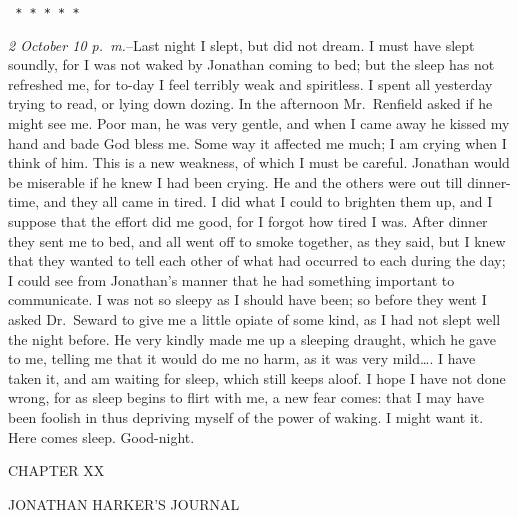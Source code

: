 \documentclass[12pt,openright]{book}
\begin{document}
\texttt{   *       *       *       *       *}

\textit{2 October 10 p. m.}–Last night I slept, but did not dream. I must have slept soundly, for I was not waked by Jonathan coming to bed; but the sleep has not refreshed me, for to-day I feel terribly weak and spiritless. I spent all yesterday trying to read, or lying down dozing. In the afternoon Mr. Renfield asked if he might see me. Poor man, he was very gentle, and when I came away he kissed my hand and bade God bless me. Some way it affected me much; I am crying when I think of him. This is a new weakness, of which I must be careful. Jonathan would be miserable if he knew I had been crying. He and the others were out till dinner-time, and they all came in tired. I did what I could to brighten them up, and I suppose that the effort did me good, for I forgot how tired I was. After dinner they sent me to bed, and all went off to smoke together, as they said, but I knew that they wanted to tell each other of what had occurred to each during the day; I could see from Jonathan’s manner that he had something important to communicate. I was not so sleepy as I should have been; so before they went I asked Dr. Seward to give me a little opiate of some kind, as I had not slept well the night before. He very kindly made me up a sleeping draught, which he gave to me, telling me that it would do me no harm, as it was very mild…. I have taken it, and am waiting for sleep, which still keeps aloof. I hope I have not done wrong, for as sleep begins to flirt with me, a new fear comes: that I may have been foolish in thus depriving myself of the power of waking. I might want it. Here comes sleep. Good-night.

CHAPTER XX

JONATHAN HARKER’S JOURNAL
\end{document}
